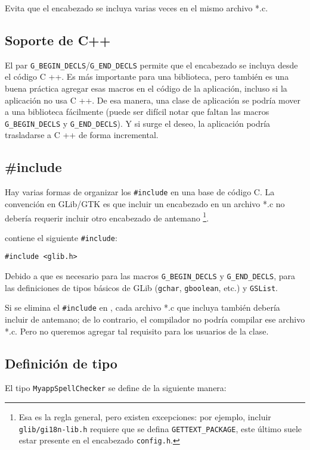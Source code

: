 Evita que el encabezado se incluya varias veces en el mismo archivo *.c.

\subsection{Soporte de C++}
El par \lstinline{G_BEGIN_DECLS}/\lstinline{G_END_DECLS} permite que el encabezado se incluya desde el código C ++. Es más importante para una biblioteca, pero también es una buena práctica agregar esas macros en el código de la aplicación, incluso si la aplicación no usa C ++. De esa manera, una clase de aplicación se podría mover a una biblioteca fácilmente (puede ser difícil notar que faltan las macros \lstinline{G_BEGIN_DECLS} y \lstinline{G_END_DECLS}). Y si surge el deseo, la aplicación podría trasladarse a C ++ de forma incremental.

\subsection{\#include}
\label{oop-semi-include-in-header}
Hay varias formas de organizar los \lstinline{#include} en una base de código C. La convención en GLib/GTK es que incluir un encabezado en un archivo *.c no debería requerir incluir otro encabezado de antemano \footnote{Esa es la regla general, pero existen excepciones: por ejemplo, incluir \lstinline{glib/gi18n-lib.h} requiere que se defina \lstinline{GETTEXT_PACKAGE}, este último suele estar presente en el encabezado \lstinline{config.h}.}.

 contiene el siguiente \lstinline{#include}:
\begin{lstlisting}[style=GLib/GTK]
#include <glib.h>
\end{lstlisting}

Debido a que  es necesario para las macros \lstinline{G_BEGIN_DECLS} y \lstinline{G_END_DECLS}, para las definiciones de tipos básicos de GLib (\lstinline{gchar}, \lstinline{gboolean}, etc.) y \lstinline{GSList}.

Si se elimina el \lstinline{#include} en , cada archivo *.c que incluya  también debería incluir  de antemano; de lo contrario, el compilador no podría compilar ese archivo *.c. Pero no queremos agregar tal requisito para los usuarios de la clase.

\subsection{Definición de tipo}
El tipo \lstinline{MyappSpellChecker} se define de la siguiente manera:

